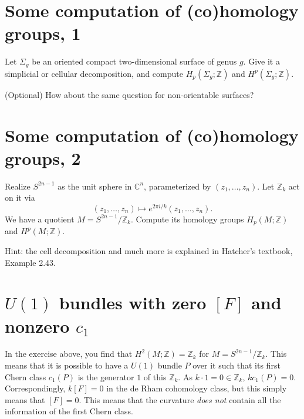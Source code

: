 \documentclass[11pt,a4paper]{article}
\def\bC{\mathbb{C}}
\def\bZ{\mathbb{Z}}
\begin{document}
\section{Some computation of (co)homology groups, 1}

Let $\Sigma_g$ be an oriented compact two-dimensional surface of genus $g$.
Give it a simplicial or cellular decomposition,
and compute $H_p(\Sigma_g;\bZ)$ and $H^p(\Sigma_g;\bZ)$.

(Optional) How about the same question for non-orientable surfaces?

\section{Some computation of (co)homology groups, 2}

Realize $S^{2n-1}$ as the unit sphere in $\bC^n$, parameterized by $(z_1,\ldots,z_n)$.
Let $\bZ_k$ act on it via 
\[
(z_1,\ldots,z_n)\mapsto e^{2\pi i/k} (z_1,\ldots, z_n).
\]
We have a quotient $M=S^{2n-1}/\bZ_k$.
Compute its homology groups $H_p(M;\bZ)$ and $H^p(M;\bZ)$.

Hint: the cell decomposition and much more is explained in Hatcher's textbook, Example 2.43.

\section{$U(1)$ bundles with zero $[F]$ and nonzero $c_1$}

In the exercise above, you find that $H^2(M;\bZ)=\bZ_k$ for $M=S^{2n-1}/\bZ_k$.
This means that it is possible to have  a $U(1)$ bundle $P$ over it such that
 its first Chern class $c_1(P)$ is the generator $1$ of this $\bZ_k$.
As $k\cdot 1=0\in \bZ_k$, $kc_1(P)=0$. 
Correspondingly, $k[F]=0$ in the de Rham cohomology class,
but this simply means that $[F]=0$.
This means that the curvature \emph{does not} contain all the information of the first Chern class.
\end{document}
